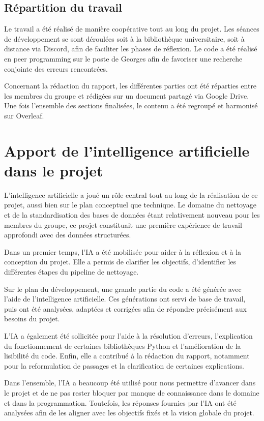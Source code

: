 \documentclass[a4paper, 12pt, twoside]{article}
\begin{document}
\subsection*{Répartition du travail}

Le travail a été réalisé de manière coopérative tout au long du projet. Les séances de développement se sont déroulées soit à la bibliothèque universitaire, soit à distance via Discord, afin de faciliter les phases de réflexion. Le code a été réalisé en peer programming sur le poste de Georges afin de favoriser une recherche conjointe des erreurs rencontrées.

Concernant la rédaction du rapport, les différentes parties ont été réparties entre les membres du groupe et rédigées sur un document partagé via Google Drive. Une fois l’ensemble des sections finalisées, le contenu a été regroupé et harmonisé sur Overleaf.

\newpage
\section{Apport de l’intelligence artificielle dans le projet}

L’intelligence artificielle a joué un rôle central tout au long de la réalisation de ce projet, aussi bien sur le plan conceptuel que technique. Le domaine du nettoyage et de la standardisation des bases de données étant relativement nouveau pour les membres du groupe, ce projet constituait une première expérience de travail approfondi avec des données structurées.

Dans un premier temps, l’IA a été mobilisée pour aider à la réflexion et à la conception du projet. Elle a permis de clarifier les objectifs, d’identifier les différentes étapes du pipeline de nettoyage.

Sur le plan du développement, une grande partie du code a été générée avec l’aide de l’intelligence artificielle. Ces générations ont servi de base de travail, puis ont été analysées, adaptées et corrigées afin de répondre précisément aux besoins du projet.

L’IA a également été sollicitée pour l’aide à la résolution d’erreurs, l’explication du fonctionnement de certaines bibliothèques Python et l’amélioration de la lisibilité du code. Enfin, elle a contribué à la rédaction du rapport, notamment pour la reformulation de passages et la clarification de certaines explications.

Dans l'ensemble, l'IA a beaucoup été utilisé pour nous permettre d'avancer dans le projet et de ne pas rester bloquer par manque de connaissance dans le domaine et dans la programmation. Toutefois, les réponses fournies par l'IA ont été analysées afin de les aligner avec les objectifs fixés et la vision globale du projet.
\end{document}
